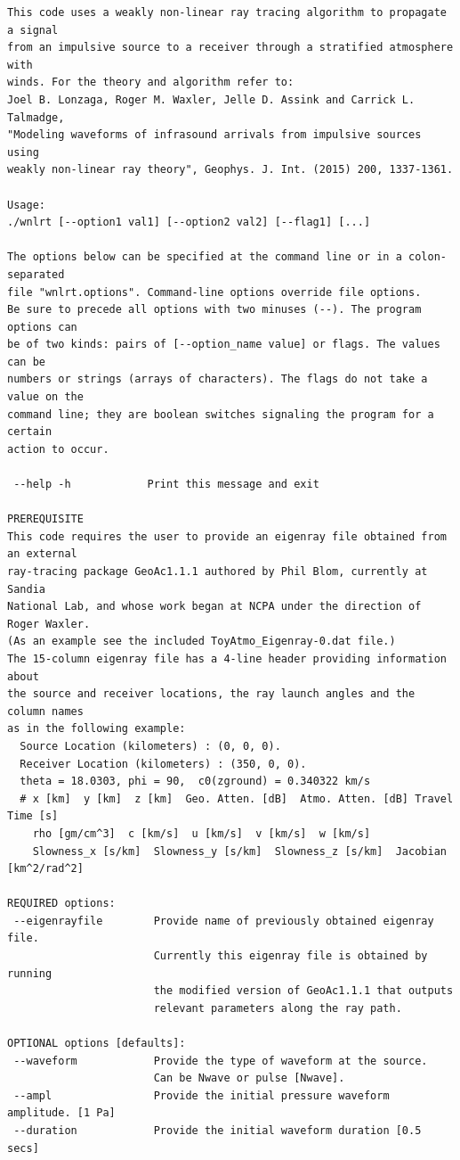 \begin{verbatim}
This code uses a weakly non-linear ray tracing algorithm to propagate a signal
from an impulsive source to a receiver through a stratified atmosphere with 
winds. For the theory and algorithm refer to: 
Joel B. Lonzaga, Roger M. Waxler, Jelle D. Assink and Carrick L. Talmadge,
"Modeling waveforms of infrasound arrivals from impulsive sources using 
weakly non-linear ray theory", Geophys. J. Int. (2015) 200, 1337-1361.

Usage: 
./wnlrt [--option1 val1] [--option2 val2] [--flag1] [...]

The options below can be specified at the command line or in a colon-separated
file "wnlrt.options". Command-line options override file options.
Be sure to precede all options with two minuses (--). The program options can
be of two kinds: pairs of [--option_name value] or flags. The values can be 
numbers or strings (arrays of characters). The flags do not take a value on the
command line; they are boolean switches signaling the program for a certain 
action to occur.

 --help -h            Print this message and exit

PREREQUISITE
This code requires the user to provide an eigenray file obtained from an external
ray-tracing package GeoAc1.1.1 authored by Phil Blom, currently at Sandia
National Lab, and whose work began at NCPA under the direction of Roger Waxler.
(As an example see the included ToyAtmo_Eigenray-0.dat file.)
The 15-column eigenray file has a 4-line header providing information about 
the source and receiver locations, the ray launch angles and the column names
as in the following example:
  Source Location (kilometers) : (0, 0, 0).
  Receiver Location (kilometers) : (350, 0, 0).
  theta = 18.0303, phi = 90,  c0(zground) = 0.340322 km/s
  # x [km]  y [km]  z [km]  Geo. Atten. [dB]  Atmo. Atten. [dB] Travel Time [s]
    rho [gm/cm^3]  c [km/s]  u [km/s]  v [km/s]  w [km/s]
    Slowness_x [s/km]  Slowness_y [s/km]  Slowness_z [s/km]  Jacobian [km^2/rad^2]

REQUIRED options:
 --eigenrayfile        Provide name of previously obtained eigenray file.
                       Currently this eigenray file is obtained by running
                       the modified version of GeoAc1.1.1 that outputs 
                       relevant parameters along the ray path.

OPTIONAL options [defaults]:
 --waveform            Provide the type of waveform at the source. 
                       Can be Nwave or pulse [Nwave]. 
 --ampl                Provide the initial pressure waveform amplitude. [1 Pa]
 --duration            Provide the initial waveform duration [0.5 secs]


\end{verbatim}
